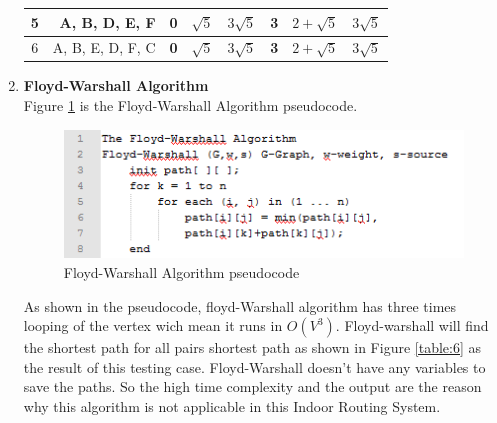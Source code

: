 \begin{enumerate}
\begin{table}[]
\begin{tabular}{|c|r|c|c|c|c|c|c|}
		5                                     & A, B, D, E, F                                                 & 0                                  & $\sqrt5$                                  & \textbf{$3\sqrt5$}                         & 3                                  & $2+\sqrt5$                                  & $3\sqrt5$                                  \\ \hline
		6                                     & A, B, E, D, F, C                                              & \cellcolor[HTML]{34FF34}\textbf{0} & \cellcolor[HTML]{34FF34}\textbf{$\sqrt5$} & \cellcolor[HTML]{34FF34}\textbf{$3\sqrt5$} & \cellcolor[HTML]{34FF34}\textbf{3} & \cellcolor[HTML]{34FF34}\textbf{$2+\sqrt5$} & \cellcolor[HTML]{34FF34}\textbf{$3\sqrt5$} \\ \hline
	\end{tabular}
\end{table}
	
	\item \textbf{Floyd-Warshall Algorithm}\\
	Figure \ref{fig:figure23} is the Floyd-Warshall Algorithm pseudocode.
	
	\begin{figure}[h!]
		\centering
		\includegraphics[scale=1]{figure7.PNG}
		\caption{Floyd-Warshall Algorithm pseudocode
		}
		\label{fig:figure23}
	\end{figure}
	
	As shown in the pseudocode, floyd-Warshall algorithm has three times looping of the vertex wich mean it runs in \textbf{$O(V^3)$}. Floyd-warshall will find the shortest path for all pairs shortest path as shown in Figure \ref{table:6} as the result of this testing case. Floyd-Warshall doesn't have any variables to save the paths. So the high time complexity and the output are the reason why this algorithm is not applicable in this Indoor Routing System.
	

\end{enumerate}
